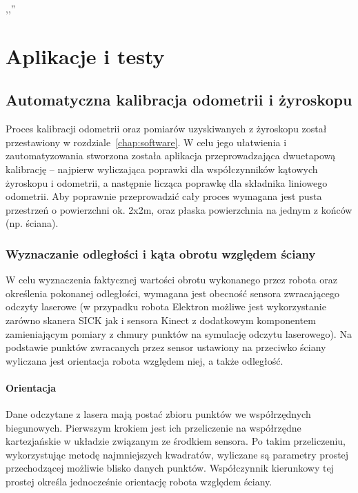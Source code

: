 

\begin{savequote}[70mm]
,,''
\qauthor{}
\end{savequote}


\chapter{Aplikacje i testy}
\label{chap:aplikacje}

\section{Automatyczna kalibracja odometrii i żyroskopu}

Proces kalibracji odometrii oraz pomiarów uzyskiwanych z żyroskopu został
przestawiony w rozdziale~\ref{chap:software}. W celu jego ułatwienia i
zautomatyzowania stworzona została aplikacja przeprowadzająca dwuetapową
kalibrację -- najpierw wyliczająca poprawki dla współczynników kątowych
żyroskopu i odometrii, a następnie licząca poprawkę dla składnika liniowego
odometrii. Aby poprawnie przeprowadzić cały proces wymagana jest pusta
przestrzeń o powierzchni ok. 2x2m, oraz płaska powierzchnia na jednym z końców
(np. ściana).

\subsection{Wyznaczanie odległości i kąta obrotu względem ściany}

W celu wyznaczenia faktycznej wartości obrotu wykonanego przez robota oraz
określenia pokonanej odległości, wymagana jest obecność sensora zwracającego
odczyty laserowe (w przypadku robota Elektron możliwe jest wykorzystanie
zarówno skanera SICK jak i sensora Kinect z dodatkowym komponentem
zamieniającym pomiary z chmury punktów na symulację odczytu laserowego). Na
podstawie punktów zwracanych przez sensor ustawiony na przeciwko ściany
wyliczana jest orientacja robota względem niej, a także odległość.

\subsubsection{Orientacja}

Dane odczytane z lasera mają postać zbioru punktów we współrzędnych biegunowych.
Pierwszym krokiem jest ich przeliczenie na współrzędne kartezjańskie w układzie
związanym ze środkiem sensora. Po takim przeliczeniu, wykorzystując metodę
najmniejszych kwadratów, wyliczane są parametry prostej przechodzącej możliwie
blisko danych punktów. Współczynnik kierunkowy tej prostej określa jednocześnie
orientację robota względem ściany.

